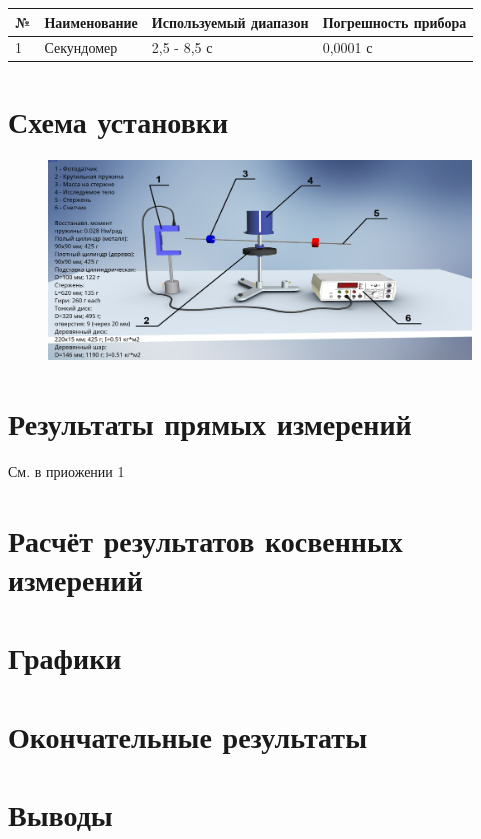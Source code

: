 \documentclass[a4paper]{article}
\begin{document}
\begin{tabular}{ l | l | l | l }\hline
№ & Наименование & Используемый диапазон & Погрешность прибора \\ \hline
1 &	Секундомер & 2,5 - 8,5 с & 	0,0001 с \\   \hline
\end{tabular}

\section{Схема установки}

\begin{figure}[h!]
   \includegraphics[scale=0.3]{stend_final.png}
    \label{stend}
\end{figure}

\section{Результаты прямых измерений}
См. в приожении 1

\section{Расчёт результатов косвенных измерений}

\section{Графики}



\section{Окончательные результаты}

\section{Выводы}
\end{document}
